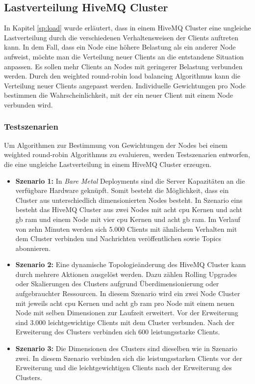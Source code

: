 \subsection{Lastverteilung HiveMQ Cluster} \label{ss:load-distribution}
In Kapitel \ref{sp:load} wurde erläutert, dass in einem HiveMQ Cluster eine ungleiche Lastverteilung durch die verschiedenen Verhaltensweisen der Clients auftreten kann.
In dem Fall, dass ein Node eine höhere Belastung als ein anderer Node aufweist, möchte man die Verteilung neuer Clients an die entstandene Situation anpassen. Es sollen mehr Clients an Nodes mit geringerer Belastung verbunden werden.
Durch den weighted round-robin load balancing Algorithmus kann die Verteilung neuer Clients angepasst werden. Individuelle Gewichtungen pro Node bestimmen die Wahrscheinlichkeit, mit der ein neuer Client mit einem Node verbunden wird.

\subsubsection{Testszenarien} \label{ss:test}
Um Algorithmen zur Bestimmung von Gewichtungen der Nodes bei einem weighted round-robin Algorithmus zu evaluieren, werden Testszenarien entworfen, die eine ungleiche Lastverteilung in einem HiveMQ Cluster erzeugen.

\begin{itemize}
  \item \textbf{Szenario 1:} In \textit{Bare Metal} Deployments sind die Server Kapazitäten an die verfügbare Hardware geknüpft. Somit besteht die Möglichkeit, dass ein Cluster aus unterschiedlich dimensionierten Nodes besteht. In Szenario eins besteht das HiveMQ Cluster aus zwei Nodes mit acht \ac{cpu} Kernen und acht \ac{gb} \ac{ram} und einem Node mit vier \ac{cpu} Kernen und acht \ac{gb} \ac{ram}. Im Verlauf von zehn Minuten werden sich 5.000 Clients mit ähnlichem Verhalten mit dem Cluster verbinden und Nachrichten veröffentlichen sowie Topics abonnieren.
  \item \textbf{Szenario 2:} Eine dynamische Topologieänderung des HiveMQ Cluster kann durch mehrere Aktionen ausgelöst werden. Dazu zählen Rolling Upgrades oder Skalierungen des Clusters aufgrund Überdimensionierung oder aufgebrauchter Ressourcen. In diesem Szenario wird ein zwei Node Cluster mit jeweils acht \ac{cpu} Kernen und acht \ac{gb} \ac{ram} pro Node mit einem neuen Node mit selben Dimensionen zur Laufzeit erweitert. Vor der Erweiterung sind 3.000 leichtgewichtige Clients mit dem Cluster verbunden. Nach der Erweiterung des Clusters verbinden sich 600 leistungsstarke Clients.
  \item \textbf{Szenario 3:} Die Dimensionen des Clusters sind dieselben wie in Szenario zwei. In diesem Szenario verbinden sich die leistungsstarken Clients vor der Erweiterung und die leichtgewichtigen Clients nach der Erweiterung des Clusters.
\end{itemize}

